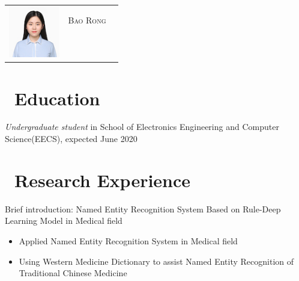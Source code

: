 \documentclass{resume}
\begin{document}

\Large{
  \begin{tabu}{ c l r }
    & \scshape{Bao Rong} \\
    &  \\
    & \\
    \\
    \\
  \end{tabu}
}


\section{\faGraduationCap\ Education}
\textit{Undergraduate student} in School of Electronics Engineering and Computer Science(EECS), expected June 2020


\section{\faUsers\ Research Experience}

Brief introduction: Named Entity Recognition System Based on Rule-Deep Learning Model in Medical field
\begin{itemize}
  \item Applied Named Entity Recognition System in Medical field
  \item Using Western Medicine Dictionary to assist Named Entity Recognition of Traditional Chinese Medicine
\end{itemize}
\end{document}
